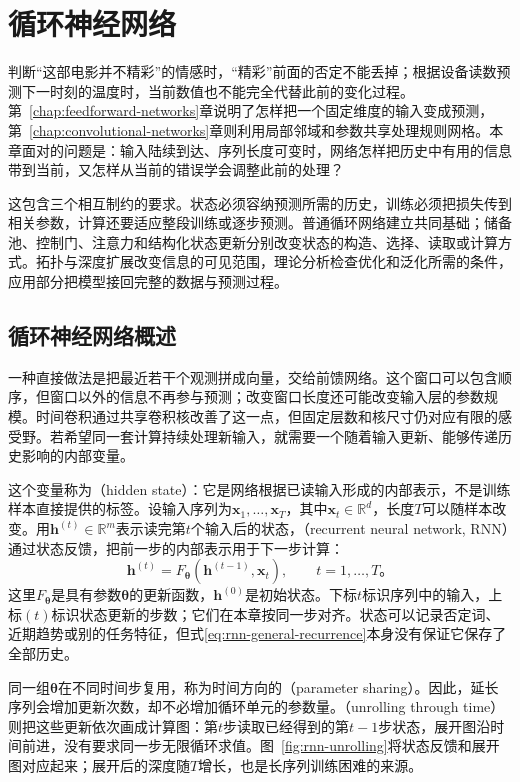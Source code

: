 \chapter{循环神经网络}
\label{chap:recurrent-networks}

判断“这部电影并不精彩”的情感时，“精彩”前面的否定不能丢掉；根据设备读数预测下一时刻的温度时，当前数值也不能完全代替此前的变化过程。第~\ref{chap:feedforward-networks}章说明了怎样把一个固定维度的输入变成预测，第~\ref{chap:convolutional-networks}章则利用局部邻域和参数共享处理规则网格。本章面对的问题是：输入陆续到达、序列长度可变时，网络怎样把历史中有用的信息带到当前，又怎样从当前的错误学会调整此前的处理？

这包含三个相互制约的要求。状态必须容纳预测所需的历史，训练必须把损失传到相关参数，计算还要适应整段训练或逐步预测。普通循环网络建立共同基础；储备池、控制门、注意力和结构化状态更新分别改变状态的构造、选择、读取或计算方式。拓扑与深度扩展改变信息的可见范围，理论分析检查优化和泛化所需的条件，应用部分把模型接回完整的数据与预测过程。

\section{循环神经网络概述}
\label{sec:rnn-overview}

一种直接做法是把最近若干个观测拼成向量，交给前馈网络。这个窗口可以包含顺序，但窗口以外的信息不再参与预测；改变窗口长度还可能改变输入层的参数规模。时间卷积通过共享卷积核改善了这一点，但固定层数和核尺寸仍对应有限的感受野。若希望同一套计算持续处理新输入，就需要一个随着输入更新、能够传递历史影响的内部变量。

这个变量称为（hidden state）：它是网络根据已读输入形成的内部表示，不是训练样本直接提供的标签。设输入序列为$\bm{x}_1,\ldots,\bm{x}_T$，其中$\bm{x}_t\in\mathbb{R}^{d}$，长度$T$可以随样本改变。用$\bm{h}^{(t)}\in\mathbb{R}^{m}$表示读完第$t$个输入后的状态，（recurrent neural network, RNN）通过状态反馈，把前一步的内部表示用于下一步计算：
\begin{equation}
  \bm{h}^{(t)}=F_{\bm{\theta}}\!\left(\bm{h}^{(t-1)},\bm{x}_t\right),
  \qquad t=1,\ldots,T\text{。}
  \label{eq:rnn-general-recurrence}
\end{equation}
这里$F_{\bm{\theta}}$是具有参数$\bm{\theta}$的更新函数，$\bm{h}^{(0)}$是初始状态。下标$t$标识序列中的输入，上标$(t)$标识状态更新的步数；它们在本章按同一步对齐。状态可以记录否定词、近期趋势或别的任务特征，但式\eqref{eq:rnn-general-recurrence}本身没有保证它保存了全部历史。

同一组$\bm{\theta}$在不同时间步复用，称为时间方向的（parameter sharing）。因此，延长序列会增加更新次数，却不必增加循环单元的参数量。（unrolling through time）则把这些更新依次画成计算图：第$t$步读取已经得到的第$t-1$步状态，展开图沿时间前进，没有要求同一步无限循环求值。图~\ref{fig:rnn-unrolling}将状态反馈和展开图对应起来；展开后的深度随$T$增长，也是长序列训练困难的来源。

